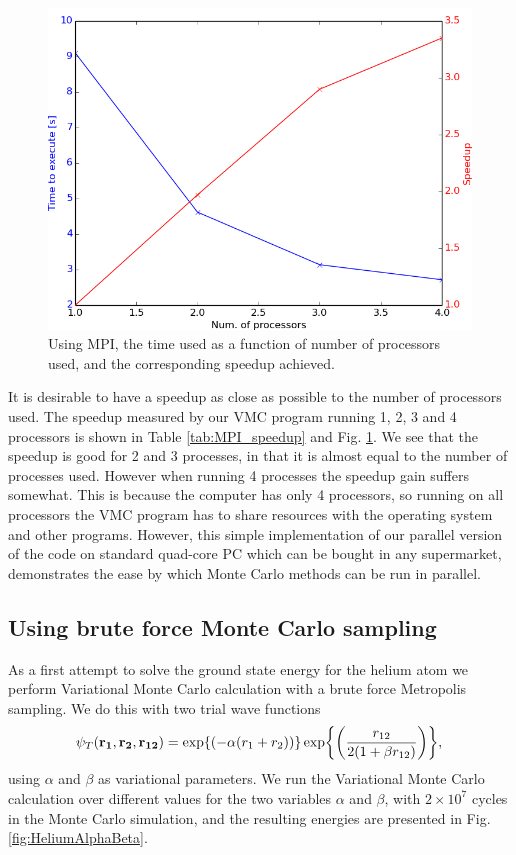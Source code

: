 		\begin{figure}
			\centering \includegraphics[width=0.49\linewidth]{content/Results/figures/processor_number_time_comparison}
			\protect\caption{Using MPI, the time used as a function of number of processors used, and the corresponding speedup achieved.}
			\label{fig:MPI_speedup}
		\end{figure}

		It is desirable to have a speedup as close as possible
                to the number of processors used. The speedup measured
                by our VMC program running 1, 2, 3 and 4 processors is shown in
                Table \ref{tab:MPI_speedup} and
                Fig. \ref{fig:MPI_speedup}. We see that the speedup is
                good for 2 and 3 processes, in that it is almost equal
                to the number of processes used. However when running
                4 processes the speedup gain suffers somewhat. This is
                because the computer has only 4 processors, so running
                on all processors the VMC program has to share
                resources with the operating system and other
                programs. However, this simple implementation of our parallel version of the code on standard quad-core PC which can be bought in any supermarket, demonstrates the ease by which Monte Carlo methods can be run in parallel. 

	\subsection{Using brute force Monte Carlo sampling}
		As a first attempt to solve the ground state energy for the helium
		atom we perform Variational Monte Carlo calculation with a brute force
		Metropolis sampling. We do this with two trial wave functions
		\[
		\psi_{T}({\bf r_{1}},{\bf r_{2}},{\bf r_{12}})=\exp{\left(-\alpha(r_{1}+r_{2})\right)}\exp{\left(\frac{r_{12}}{2(1+\beta r_{12})}\right)},
		\]
		using $\alpha$ and $\beta$ as variational parameters. 
		We run the Variational Monte Carlo calculation over
		different values for the two variables $\alpha$ and $\beta$, 
		with $2\times10^{7}$ cycles in the Monte Carlo simulation, and the resulting energies are
		presented in Fig. \ref{fig:HeliumAlphaBeta}.
		
